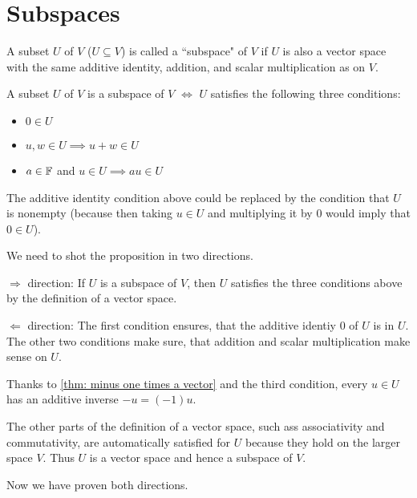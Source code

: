 \section{Subspaces}

\begin{mydef}
  A subset $U$ of $V$ ($U \subseteq V$) is called a ``subspace" of $V$ if $U$ is also a vector space with the same additive identity, addition, and scalar multiplication as on $V$.
\end{mydef}

\begin{thm} 
  A subset $U$ of $V$ is a subspace of $V$ $\iff$ $U$ satisfies the following three conditions:
  \begin{itemize}
    \item {}
    $0 \in U$
    \item {}
    $u,w \in U \implies u+w \in U$
    \item {}
    $a \in \mathbb{F}$ and $u \in U \implies au \in U$
  \end{itemize}
  The additive identity condition above could be replaced by the condition that $U$ is nonempty (because then taking $u \in U$ and multiplying it by $0$ would imply that $0\in U$).
\end{thm}
\begin{prf} We need to shot the proposition in two directions.
  \begin{description} 
    \item{$\Rightarrow$ direction:} If $U$ is a subspace of $V$, then $U$ satisfies the three conditions above by the definition of a vector space.
    \item{$\Leftarrow$ direction:} The first condition ensures, that the additive identiy $0$ of $U$ is in $U$. The other two conditions make sure, that addition and scalar multiplication make sense on $U$.
    
    Thanks to \ref{thm: minus one times a vector} and the third condition, every $u \in U$ has an additive inverse $-u = (-1) u$.
    
    The other parts of the definition of a vector space, such ass associativity and commutativity, are automatically satisfied for $U$ because they hold on the larger space $V$. Thus $U$ is a vector space and hence a subspace of $V$.
  \end{description}
  Now we have proven both directions.
\end{prf}

